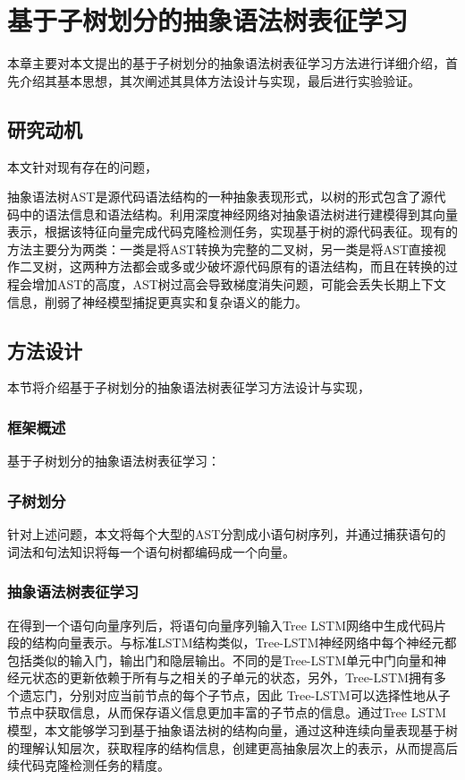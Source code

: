 \chapter{基于子树划分的抽象语法树表征学习}
\label{chap:AST}
本章主要对本文提出的基于子树划分的抽象语法树表征学习方法进行详细介绍，首先介绍其基本思想，其次阐述其具体方法设计与实现，最后进行实验验证。
\section{研究动机}
本文针对现有存在的问题，

抽象语法树AST是源代码语法结构的一种抽象表现形式，以树的形式包含了源代码中的语法信息和语法结构。利用深度神经网络对抽象语法树进行建模得到其向量表示，根据该特征向量完成代码克隆检测任务，实现基于树的源代码表征。现有的方法主要分为两类：一类是将AST转换为完整的二叉树，另一类是将AST直接视作二叉树，这两种方法都会或多或少破坏源代码原有的语法结构，而且在转换的过程会增加AST的高度，AST树过高会导致梯度消失问题，可能会丢失长期上下文信息，削弱了神经模型捕捉更真实和复杂语义的能力。
\section{方法设计}

本节将介绍基于子树划分的抽象语法树表征学习方法设计与实现， 

\subsection{框架概述}
基于子树划分的抽象语法树表征学习：

\subsection{子树划分}
针对上述问题，本文将每个大型的AST分割成小语句树序列，并通过捕获语句的词法和句法知识将每一个语句树都编码成一个向量。
\subsection{抽象语法树表征学习}
在得到一个语句向量序列后，将语句向量序列输入Tree LSTM网络中生成代码片段的结构向量表示。与标准LSTM结构类似，Tree-LSTM神经网络中每个神经元都包括类似的输入门，输出门和隐层输出。不同的是Tree-LSTM单元中门向量和神经元状态的更新依赖于所有与之相关的子单元的状态，另外，Tree-LSTM拥有多个遗忘门，分别对应当前节点的每个子节点，因此 Tree-LSTM可以选择性地从子节点中获取信息，从而保存语义信息更加丰富的子节点的信息。通过Tree LSTM模型，本文能够学习到基于抽象语法树的结构向量，通过这种连续向量表现基于树的理解认知层次，获取程序的结构信息，创建更高抽象层次上的表示，从而提高后续代码克隆检测任务的精度。
